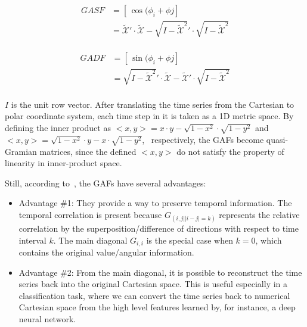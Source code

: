 \begin{equation}
\begin{aligned}
GASF &= [\,\cos(\phi_{i} + \phi{j}]\, \\
	 &= \widetilde{\mathcal{X}}' \cdot \widetilde{\mathcal{X}} - \sqrt{I-\widetilde{\mathcal{X}}^2}' \cdot \sqrt{I-\widetilde{\mathcal{X}}^2}
\end{aligned}
\end{equation}
\\
\begin{equation}
\begin{aligned}
GADF &= [\,\sin(\phi_{i} + \phi{j}]\, \\
	 &= \sqrt{I-\widetilde{\mathcal{X}}^2}' \cdot \widetilde{\mathcal{X}} - \widetilde{\mathcal{X}}' \cdot \sqrt{I-\widetilde{\mathcal{X}}^2}\\
\end{aligned}
\end{equation}

$I$ is the unit row vector. After translating the time series from the Cartesian to polar coordinate system, each time step in it is taken as a 1D metric space. By defining the inner product as 
\mbox{$<x,y> = x \cdot y - \sqrt{1-x^2} \cdot \sqrt{1-y^2}$ and $<x,y> = \sqrt{1-x^2} \cdot y - x \cdot \sqrt{1-y^2}$, } 
respectively, the GAFs become {quasi-Gramian} matrices, since the defined $<x,y>$ do not satisfy the property of linearity in inner-product space.

Still, according to~\cite{wang_imaging_2015}, the GAFs have several advantages:

\begin{itemize}[leftmargin=*,labelsep=5.8mm]
\item {Advantage \#1}: They provide a way to preserve temporal information. The temporal correlation is present because $G_{(i,j||i-j|=k)}$ represents the relative correlation by the superposition/difference of directions with respect to time interval $k$. The main diagonal $G_{i,i}$ is the special case when $k = 0$, which contains the original value/angular information. 
\item {Advantage \#2:} From the main diagonal, it is possible to reconstruct the time series back into the original Cartesian space. This is useful especially in a classification task, where we can convert the time series back to numerical Cartesian space from the high level features learned by, for instance, a deep neural network.
\end{itemize}

